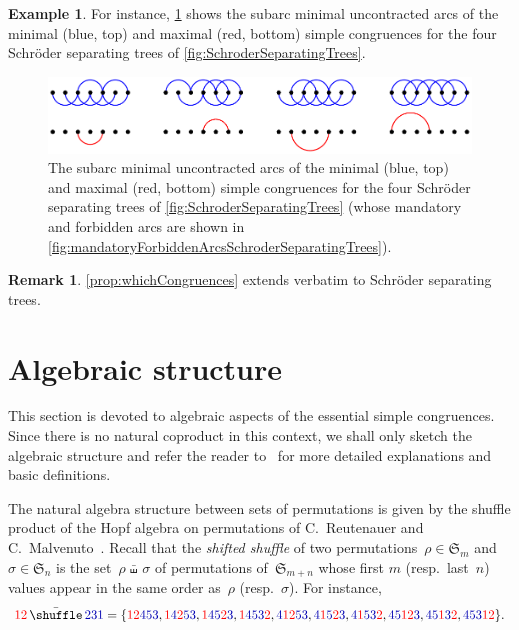 \documentclass{amsart}
\theoremstyle{definition}
\newtheorem{example}[theorem]{Example}
\newtheorem{remark}[theorem]{Remark}
\newcommand{\f}[1]{{\mathfrak{#1}}} %
\newcommand{\shiftedShuffle}{\,\bar\shuffle\,} %
\newcommand{\red}{\color{red}} %
\newcommand{\darkblue}{\color{darkblue}} %
\newcommand{\defn}[1]{\textsl{\darkblue #1}} %
\begin{document}
\begin{example}
For instance, \cref{fig:minMaxCongruencesSchroderSeparatingTrees} shows the subarc minimal uncontracted arcs of the minimal (blue, top) and maximal (red, bottom) simple congruences for the four Schröder separating trees of \cref{fig:SchroderSeparatingTrees}.
\begin{figure}
	\capstart
	\centerline{\includegraphics[scale=.85]{minMaxCongruencesSchroderSeparatingTrees}}
	\caption{The subarc minimal uncontracted arcs of the minimal (blue, top) and maximal (red, bottom) simple congruences for the four Schröder separating trees of \cref{fig:SchroderSeparatingTrees} (whose mandatory and forbidden arcs are shown in \cref{fig:mandatoryForbiddenArcsSchroderSeparatingTrees}).}
	\label{fig:minMaxCongruencesSchroderSeparatingTrees}
\end{figure}
\end{example}

\begin{remark}
\cref{prop:whichCongruences} extends verbatim to Schröder separating trees.
\end{remark}


\section{Algebraic structure}
\label{sec:algebraicStructure}

This section is devoted to algebraic aspects of the essential simple congruences.
Since there is no natural coproduct in this context, we shall only sketch the algebraic structure and refer the reader to~\cite{ChatelPilaud, PilaudPons-permutrees, Pilaud-arcDiagramAlgebra} for more detailed explanations and basic definitions.

The natural algebra structure between sets of permutations is given by the shuffle product of the Hopf algebra on permutations of C.~Reutenauer and C.~Malvenuto~\cite{MalvenutoReutenauer}.
Recall that the \defn{shifted shuffle} of two permutations~$\rho \in \f{S}_m$ and~$\sigma \in \f{S}_n$ is the set~$\rho \shiftedShuffle \sigma$ of permutations of~$\f{S}_{m+n}$ whose first $m$ (resp.~last~$n$) values appear in the same order as~$\rho$ (resp.~$\sigma$).
For instance,
\[
{\red 12} \shiftedShuffle {\darkblue 231} = \{ {\red 12}{\darkblue 453}, {\red 1}{\darkblue 4}{\red 2}{\darkblue 53}, {\red 1}{\darkblue 45}{\red 2}{\darkblue 3}, {\red 1}{\darkblue 453}{\red 2}, {\darkblue 4}{\red 12}{\darkblue 53}, {\darkblue 4}{\red 1}{\darkblue 5}{\red 2}{\darkblue 3}, {\darkblue 4}{\red 1}{\darkblue 53}{\red 2}, {\darkblue 45}{\red 12}{\darkblue 3}, {\darkblue 45}{\red 1}{\darkblue 3}{\red 2}, {\darkblue 453}{\red 12} \}.
\]
\end{document}
